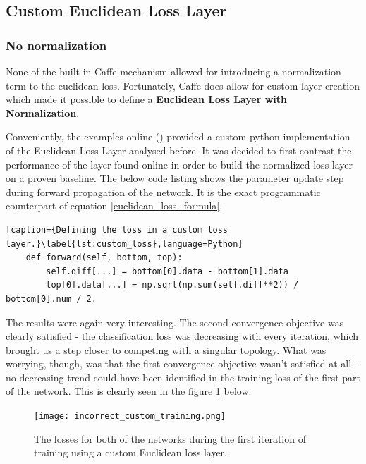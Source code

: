 \documentclass[a4paper, 12pt]{article}
\numberwithin{equation}{section}
\begin{document}
	\subsection{Custom Euclidean Loss Layer}

	\subsubsection{No normalization}

	None of the built-in Caffe mechanism allowed for introducing a normalization term to the euclidean loss. Fortunately, Caffe does allow for custom layer creation which made it possible to define a \textbf{Euclidean Loss Layer with Normalization}.

	Conveniently, the examples online (\cite{caffe2016loss}) provided a custom python implementation of the Euclidean Loss Layer analysed before. It was decided to first contrast the performance of the layer found online in order to build the normalized loss layer on a proven baseline. The below code listing shows the parameter update step during forward propagation of the network. It is the exact programmatic counterpart of equation \ref{euclidean_loss_formula}.

	\begin{lstlisting}[caption={Defining the loss in a custom loss layer.}\label{lst:custom_loss},language=Python]
	def forward(self, bottom, top):
	    self.diff[...] = bottom[0].data - bottom[1].data
	    top[0].data[...] = np.sqrt(np.sum(self.diff**2)) / bottom[0].num / 2.
	\end{lstlisting}

	The results were again very interesting. The second convergence objective was clearly satisfied - the classification loss was decreasing with every iteration, which brought us a step closer to competing with a singular topology. What was worrying, though, was that the first convergence objective wasn't satisfied at all - no decreasing trend could have been identified in the training loss of the first part of the network. This is clearly seen in the figure \ref{fig:incorrect_custom_training} below.

	\begin{figure}[!h]
		\centering
		\texttt{[image: incorrect\_custom\_training.png]}
		\caption{\label{fig:incorrect_custom_training}{The losses for both of the networks during the first iteration of training using a custom Euclidean loss layer.}}
	\end{figure}
\end{document}
